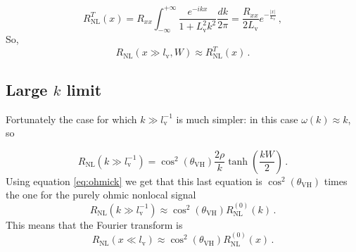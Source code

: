 \begin{equation}
    R_{\textrm{NL}}^T(x)=
    R_{xx}\int_{-\infty}^{+\infty}
    \frac {e^{-ikx}}{1+L_\textrm{v}^2k^2}
    \frac {dk}{2\pi}=
    \frac{R_{xx}}{2L_\textrm{v}}e^{-\frac{|x|}{L_\textrm{v}}}\,,
\end{equation}
So,
\begin{equation}
    R_{\textrm{NL}}(x\gg l_\textrm{v},W)\approx R_{\textrm{NL}}^T(x)\,.
    \label{eq:rxg}
\end{equation}

\subsection{Large $k$ limit}
Fortunately the case for which $k\gg l_\textrm{v}^{-1}$ is much simpler: in this case $\omega(k) \approx k$, so

\begin{equation}
    R_{\textrm{NL}}(k\gg l_\textrm{v}^{-1})=\cos^2(\theta_{\textrm{VH}})\frac {2\rho}{k}\tanh\left(\frac{kW}2\right)\,.
\end{equation}
Using equation \ref{eq:ohmick} we get that this last equation is $\cos^2(\theta_{\textrm{VH}})$ times the one for the purely ohmic nonlocal signal
\begin{equation}
    R_{\textrm{NL}}(k\gg l_\textrm{v}^{-1})\approx
    \cos^2(\theta_{\textrm{VH}})R_{\textrm{NL}}^{(0)}(k)\,.
\end{equation}
This means that the Fourier transform is
\begin{equation}
    R_{\textrm{NL}}(x\ll l_\textrm{v})\approx\cos^2(\theta_{\textrm{VH}})R_{\textrm{NL}}^{(0)}(x)\,.
    \label{eq:rxl}
\end{equation}
